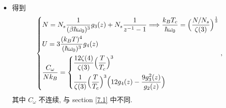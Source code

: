 \begin{itemize}
	\item 得到
	\begin{equation}
		\begin{dcases}
			N = N_s \frac{1}{(\beta \hbar \omega_0)^3} g_3(z) + N_s \frac{1}{z^{- 1} - 1} \Longrightarrow \frac{k_B T_c}{\hbar \omega_0} = \Big( \frac{N / N_s}{\zeta(3)} \Big)^{\frac{1}{3}} \\
			U = 3 \frac{(k_B T)^4}{(\hbar \omega_0)^3} g_4(z) \\
			\frac{C_\omega}{N k_B} = \begin{dcases}
				\frac{12 \zeta(4)}{\zeta(3)} \Big( \frac{T}{T_c} \Big)^3 \\
				\frac{1}{\zeta(3)} \Big( \frac{T}{T_c} \Big)^3 \Big( 12 g_4(z) - \frac{9 g_3^2(z)}{g_2(z)} \Big)
			\end{dcases}
		\end{dcases},
	\end{equation}
	其中 $C_\omega$ 不连续, 与 section \ref{7.1} 中不同.
\end{itemize}

